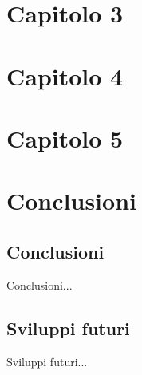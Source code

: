 \documentclass[12pt,italian]{report}
\begin{document}
% 
% 

\chapter{Capitolo 3}
\label{chap:classificatore}



% 
% 

\chapter{Capitolo 4}
\label{chap:datasets}


% 
% 

\chapter{Capitolo 5}
\label{chap:risultati}


% 
% 

\chapter{Conclusioni}
\label{cap6}

\section{Conclusioni}

Conclusioni...

\section{Sviluppi futuri}

Sviluppi futuri...



%
%



\end{document}
